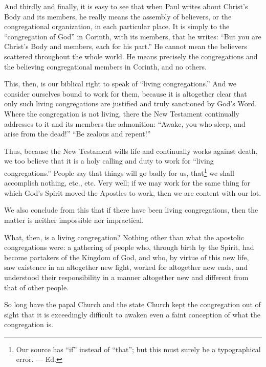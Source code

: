 And thirdly and finally, it is easy to see that when Paul writes about Christ’s Body and its members, he really means the assembly of believers, or the congregational organization, in each particular place. It is simply to the “congregation of God” in Corinth, with its members, that he writes: “But you are Christ’s Body and members, each for his part.” He cannot mean the believers scattered throughout the whole world. He means precisely the congregations and the believing congregational members in Corinth, and no others.

This, then, is our biblical right to speak of “living congregations.” And we consider ourselves bound to work for them, because it is altogether clear that only such living congregations are justified and truly sanctioned by God’s Word. Where the congregation is not living, there the New Testament continually addresses to it and its members the admonition: “Awake, you who sleep, and arise from the dead!” “Be zealous and repent!”

Thus, because the New Testament wills life and continually works against death, we too believe that it is a holy calling and duty to work for “living congregations.” People say that things will go badly for us, that\footnote{Our source has ``if'' instead of ``that''; but this must surely be a typographical error. --- Ed.} we shall accomplish nothing, etc., etc. Very well; if we may work for the same thing for which God’s Spirit moved the Apostles to work, then we are content with our lot.

We also conclude from this that if there have been living congregations, then the matter is neither impossible nor impractical.

What, then, is a living congregation? Nothing other than what the apostolic congregations were: a gathering of people who, through birth by the Spirit, had become partakers of the Kingdom of God, and who, by virtue of this new life, saw existence in an altogether new light, worked for altogether new ends, and understood their responsibility in a manner altogether new and different from that of other people.

So long have the papal Church and the state Church kept the congregation out of sight that it is exceedingly difficult to awaken even a faint conception of what the congregation is.

